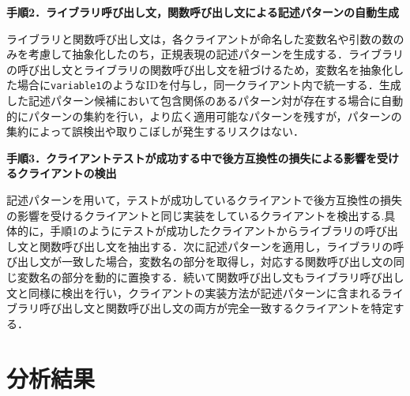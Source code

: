 \documentclass[twocolumn]{jarticle} %
\begin{document}
\noindent\textbf{手順2．ライブラリ呼び出し文，関数呼び出し文による記述パターンの自動生成}

ライブラリと関数呼び出し文は，各クライアントが命名した変数名や引数の数のみを考慮して抽象化したのち，正規表現の記述パターンを生成する．ライブラリの呼び出し文とライブラリの関数呼び出し文を紐づけるため，変数名を抽象化した場合に\texttt{variable1}のようなIDを付与し，同一クライアント内で統一する．生成した記述パターン候補において包含関係のあるパターン対が存在する場合に自動的にパターンの集約を行い，より広く適用可能なパターンを残すが，パターンの集約によって誤検出や取りこぼしが発生するリスクはない．

\noindent\textbf{手順3．クライアントテストが成功する中で後方互換性の損失による影響を受けるクライアントの検出}

記述パターンを用いて，テストが成功しているクライアントで後方互換性の損失の影響を受けるクライアントと同じ実装をしているクライアントを検出する.具体的に，手順1のようにテストが成功したクライアントからライブラリの呼び出し文と関数呼び出し文を抽出する．次に記述パターンを適用し，ライブラリの呼び出し文が一致した場合，変数名の部分を取得し，対応する関数呼び出し文の同じ変数名の部分を動的に置換する．続いて関数呼び出し文もライブラリ呼び出し文と同様に検出を行い，クライアントの実装方法が記述パターンに含まれるライブラリ呼び出し文と関数呼び出し文の両方が完全一致するクライアントを特定する．

\section{分析結果}
\end{document}
